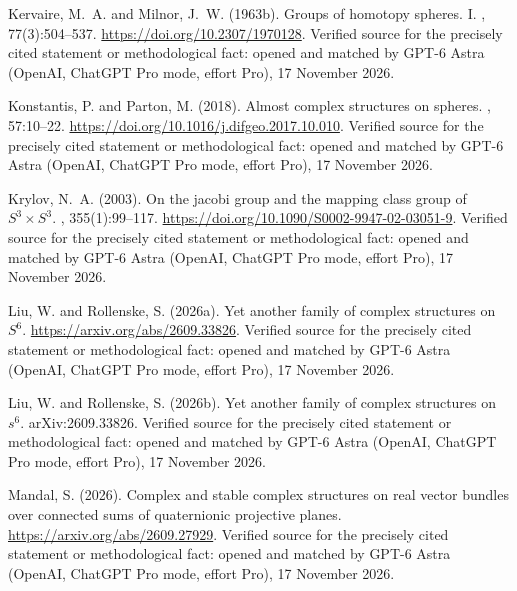 \begin{thebibliography}{}
Kervaire, M.~A. and Milnor, J.~W. (1963b).
\newblock Groups of homotopy spheres. {I}.
, 77(3):504--537.
\newblock \url{https://doi.org/10.2307/1970128}. Verified source for the precisely cited statement or methodological fact: opened and matched by GPT-6 Astra (OpenAI, ChatGPT Pro mode, effort Pro), 17 November 2026.

Konstantis, P. and Parton, M. (2018).
\newblock Almost complex structures on spheres.
, 57:10--22.
\newblock \url{https://doi.org/10.1016/j.difgeo.2017.10.010}. Verified source for the precisely cited statement or methodological fact: opened and matched by GPT-6 Astra (OpenAI, ChatGPT Pro mode, effort Pro), 17 November 2026.

Krylov, N.~A. (2003).
\newblock On the jacobi group and the mapping class group of {$S^3\times S^3$}.
,
  355(1):99--117.
\newblock \url{https://doi.org/10.1090/S0002-9947-02-03051-9}. Verified source for the precisely cited statement or methodological fact: opened and matched by GPT-6 Astra (OpenAI, ChatGPT Pro mode, effort Pro), 17 November 2026.

Liu, W. and Rollenske, S. (2026a).
\newblock Yet another family of complex structures on {$S^6$}.
\newblock \url{https://arxiv.org/abs/2609.33826}. Verified source for the precisely cited statement or methodological fact: opened and matched by GPT-6 Astra (OpenAI, ChatGPT Pro mode, effort Pro), 17 November 2026.

Liu, W. and Rollenske, S. (2026b).
\newblock Yet another family of complex structures on $s^6$.
\newblock arXiv:2609.33826. Verified source for the precisely cited statement or methodological fact: opened and matched by GPT-6 Astra (OpenAI, ChatGPT Pro mode, effort Pro), 17 November 2026.

Mandal, S. (2026).
\newblock Complex and stable complex structures on real vector bundles over
  connected sums of quaternionic projective planes.
\newblock \url{https://arxiv.org/abs/2609.27929}. Verified source for the precisely cited statement or methodological fact: opened and matched by GPT-6 Astra (OpenAI, ChatGPT Pro mode, effort Pro), 17 November 2026.


\end{thebibliography}
